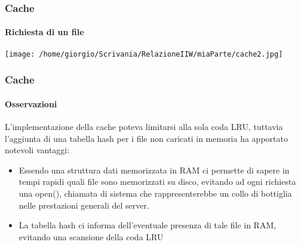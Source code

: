 \documentclass{beamer}
\begin{document}
\begin{frame}
\frametitle{Cache}
\framesubtitle{Richiesta di un file}

\begin{center}
\texttt{[image: /home/giorgio/Scrivania/RelazioneIIW/miaParte/cache2.jpg]}
\end{center}


\end{frame}


\begin{frame}
\frametitle{Cache}
\framesubtitle{Osservazioni}


L’implementazione della cache poteva limitarsi alla sola coda LRU, tuttavia
l’aggiunta di una tabella hash per i file non caricati in memoria ha apportato
notevoli vantaggi:
\begin{itemize}
\item Essendo una struttura dati memorizzata in RAM ci permette di sapere in tempi
rapidi quali file sono memorizzati su disco, evitando ad ogni richiesta una
open(), chiamata di sistema che rappresenterebbe un collo di bottiglia nelle prestazioni generali del server.
\item La tabella hash ci informa dell’eventuale presenza di tale file in RAM, evitando
una scansione della coda LRU
\end{itemize}
\end{frame}
\end{document}
